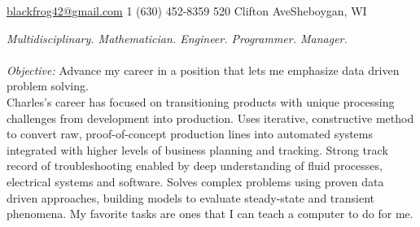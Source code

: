 \documentclass[10pt,a4paper]{article} %
\begin{document}
 



\noindent\href{mailtto:blackfrog42@gmail.com}{blackfrog42@gmail.com}\bull %
\textsmaller{+}1 (630) 452-8359\bull %
520 Clifton Ave\bull Sheboygan, WI%

\spacedhrule{0.9em}{-0.4em} %



\vspace{-1.3em} %

\begin{multicols}{2}  %
\noindent \textit{Multidisciplinary. Mathematician. Engineer. Programmer. Manager.}\\\\
\emph{Objective: }Advance my career in a position that lets me emphasize  data driven problem solving. \\

Charles's career has focused on transitioning products with unique processing challenges from development into production.  Uses iterative, constructive method to convert raw, proof-of-concept production lines into automated systems integrated with higher levels of business planning and tracking. Strong track record of troubleshooting enabled by deep understanding of fluid processes, electrical systems and software. Solves complex problems using proven data driven approaches, building models to evaluate steady-state and transient phenomena. My favorite tasks are ones that I can teach a computer to do for me. 

\end{multicols}
\end{document}
